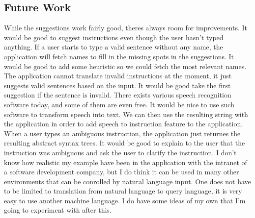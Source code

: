 \documentclass[
10pt, %
a4paper, %
oneside, %
headinclude,footinclude, %
BCOR5mm, %
]{scrartcl}
\begin{document}
\subsection{Future Work}
While the suggestions work fairly good, theres always room for improvements.
\newline
\newline
It would be good to suggest instructions even though the user hasn't typed anything.
\newline
\newline
If a user starts to type a valid sentence without any name, the application will fetch names to fill in the missing spots in the suggestions. It would be good to add some heuristic so we could fetch the most relevant names.
\newline
\newline
The application cannot translate invalid instructions at the moment, it just suggests valid sentences based on the input. It would be good take the first suggestion if the sentence is invalid.
\newline
\newline
There exists various speech recognition software today, and some of them are even free. It would be nice to use such software to transform speech into text. We can then use the resulting string with the application in order to add speech to instruction feature to the application.
\newline
\newline
When a user types an ambiguous instruction, the application just returnes the resulting abstract syntax trees. It would be good to explain to the user that the instruction was ambiguous and ask the user to clarify the instruction.
\newline
\newline
I don't know how realistic my example have been in the application with the intranet of a software development company, but I do think it can be used in many other environments that can be conrolled by natural language input. One does not have to be limited to translation from natural language to query language, it is very easy to use another machine language. I do have some ideas of my own that I'm going to experiment with after this.
\end{document}
